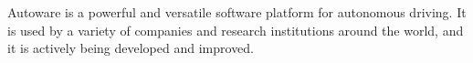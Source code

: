 Autoware is a powerful and versatile software platform for autonomous driving. It is used by a variety of companies and research institutions around the world, and it is actively being developed and improved.










